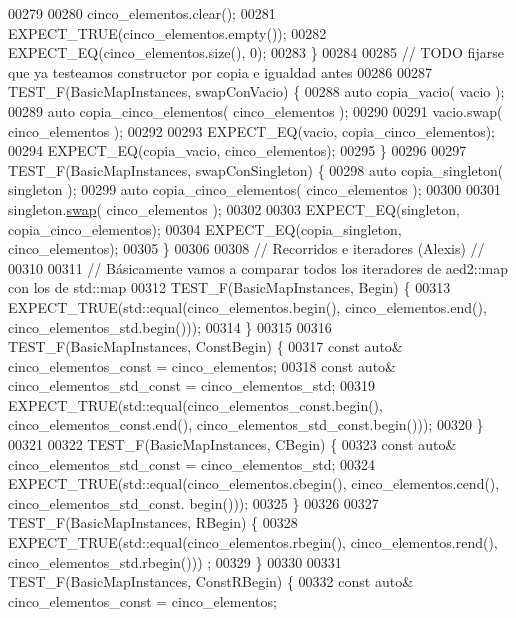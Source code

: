 \begin{DoxyCode}
00279 
00280     cinco\_elementos.clear();
00281     EXPECT\_TRUE(cinco\_elementos.empty());
00282     EXPECT\_EQ(cinco\_elementos.size(), 0);
00283 \}
00284 
00285 \textcolor{comment}{// TODO fijarse que ya testeamos constructor por copia e igualdad antes}
00286 
00287 TEST\_F(BasicMapInstances, swapConVacio) \{
00288     \textcolor{keyword}{auto} copia\_vacio( vacio );
00289     \textcolor{keyword}{auto} copia\_cinco\_elementos( cinco\_elementos );
00290 
00291     vacio.swap( cinco\_elementos );
00292 
00293     EXPECT\_EQ(vacio, copia\_cinco\_elementos);
00294     EXPECT\_EQ(copia\_vacio, cinco\_elementos);
00295 \}
00296 
00297 TEST\_F(BasicMapInstances, swapConSingleton) \{
00298     \textcolor{keyword}{auto} copia\_singleton( singleton );
00299     \textcolor{keyword}{auto} copia\_cinco\_elementos( cinco\_elementos );
00300 
00301     singleton.\hyperlink{classaed2_1_1map_a43ddb71cc91e5c6021a7a1f243d6cc4a_a43ddb71cc91e5c6021a7a1f243d6cc4a}{swap}( cinco\_elementos );
00302 
00303     EXPECT\_EQ(singleton, copia\_cinco\_elementos);
00304     EXPECT\_EQ(copia\_singleton, cinco\_elementos);
00305 \}
00306 
00308 \textcolor{comment}{// Recorridos e iteradores (Alexis) //}
00310 \textcolor{comment}{}
00311 \textcolor{comment}{// Básicamente vamos a comparar todos los iteradores de aed2::map con los de std::map}
00312 TEST\_F(BasicMapInstances, Begin) \{
00313     EXPECT\_TRUE(std::equal(cinco\_elementos.begin(), cinco\_elementos.end(), cinco\_elementos\_std.begin()));
00314 \}
00315 
00316 TEST\_F(BasicMapInstances, ConstBegin) \{
00317     \textcolor{keyword}{const} \textcolor{keyword}{auto}& cinco\_elementos\_const = cinco\_elementos;
00318     \textcolor{keyword}{const} \textcolor{keyword}{auto}& cinco\_elementos\_std\_const = cinco\_elementos\_std;
00319     EXPECT\_TRUE(std::equal(cinco\_elementos\_const.begin(), cinco\_elementos\_const.end(), 
      cinco\_elementos\_std\_const.begin()));
00320 \}
00321 
00322 TEST\_F(BasicMapInstances, CBegin) \{
00323     \textcolor{keyword}{const} \textcolor{keyword}{auto}& cinco\_elementos\_std\_const = cinco\_elementos\_std;
00324     EXPECT\_TRUE(std::equal(cinco\_elementos.cbegin(), cinco\_elementos.cend(), cinco\_elementos\_std\_const.
      begin()));
00325 \}
00326 
00327 TEST\_F(BasicMapInstances, RBegin) \{
00328     EXPECT\_TRUE(std::equal(cinco\_elementos.rbegin(), cinco\_elementos.rend(), cinco\_elementos\_std.rbegin()))
      ;
00329 \}
00330 
00331 TEST\_F(BasicMapInstances, ConstRBegin) \{
00332     \textcolor{keyword}{const} \textcolor{keyword}{auto}& cinco\_elementos\_const = cinco\_elementos;

\end{DoxyCode}
